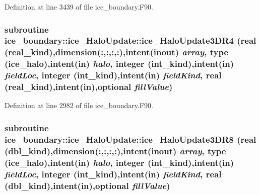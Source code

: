 Definition at line 3439 of file ice\_\-boundary.F90.\hypertarget{interfaceice__boundary_1_1ice__HaloUpdate_a11cc4970931ed0152cd3bb0dd69be05d}{
\subsubsection[{ice\_\-HaloUpdate3DR4}]{\setlength{\rightskip}{0pt plus 5cm}subroutine ice\_\-boundary::ice\_\-HaloUpdate::ice\_\-HaloUpdate3DR4 (real (real\_\-kind),dimension(:,:,:,:),intent(inout) {\em array}, \/  type ({\bf ice\_\-halo}),intent(in) {\em halo}, \/  integer (int\_\-kind),intent(in) {\em fieldLoc}, \/  integer (int\_\-kind),intent(in) {\em fieldKind}, \/  real (real\_\-kind),intent(in),optional {\em fillValue})}}
\label{interfaceice__boundary_1_1ice__HaloUpdate_a11cc4970931ed0152cd3bb0dd69be05d}


Definition at line 2982 of file ice\_\-boundary.F90.\hypertarget{interfaceice__boundary_1_1ice__HaloUpdate_a51bf55a574af1fb833d88d67aa6bee2e}{
\subsubsection[{ice\_\-HaloUpdate3DR8}]{\setlength{\rightskip}{0pt plus 5cm}subroutine ice\_\-boundary::ice\_\-HaloUpdate::ice\_\-HaloUpdate3DR8 (real (dbl\_\-kind),dimension(:,:,:,:),intent(inout) {\em array}, \/  type ({\bf ice\_\-halo}),intent(in) {\em halo}, \/  integer (int\_\-kind),intent(in) {\em fieldLoc}, \/  integer (int\_\-kind),intent(in) {\em fieldKind}, \/  real (dbl\_\-kind),intent(in),optional {\em fillValue})}}
\label{interfaceice__boundary_1_1ice__HaloUpdate_a51bf55a574af1fb833d88d67aa6bee2e}


